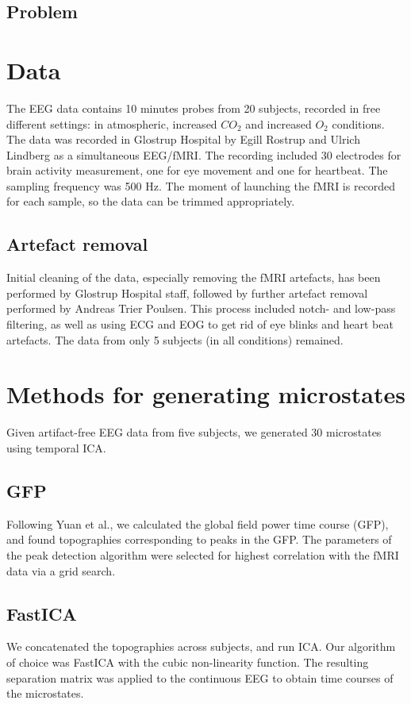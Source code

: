 \documentclass{article}
\begin{document}
\subsection{Problem}


\section{Data}
\label{sec:data}
The EEG data contains 10 minutes probes from 20 subjects, recorded in free different settings: in atmospheric, increased $CO_2$ and increased $O_2$ conditions. The data was recorded in Glostrup Hospital by Egill Rostrup and Ulrich Lindberg as a simultaneous EEG/fMRI. The recording included 30 electrodes for brain activity measurement, one for eye movement and one for heartbeat. The sampling frequency was 500 Hz. The moment of launching the fMRI is recorded for each sample, so the data can be trimmed appropriately.
\subsection{Artefact removal}
Initial cleaning of the data, especially removing the fMRI artefacts, has been performed 
by Glostrup Hospital staff,  followed by further artefact removal performed by Andreas Trier Poulsen. This process included notch- and low-pass filtering, as well as using ECG and EOG to get rid of eye blinks and heart beat artefacts. 
The data from only 5 subjects (in all conditions) remained.

\section{Methods for generating microstates}
Given artifact-free EEG data from five subjects, we generated 30 microstates using temporal ICA.
\subsection{GFP}
Following Yuan et al., we calculated the global field power time course (GFP), and found topographies corresponding to peaks in the GFP. The parameters of the peak detection algorithm were selected for highest correlation with the fMRI data via a grid search.
\subsection{FastICA}
We concatenated the topographies across subjects, and run ICA. Our algorithm of choice was FastICA \cite{fast_robust} with the cubic non-linearity function. The resulting separation matrix was applied to the continuous EEG to obtain time courses of the microstates.
\end{document}
